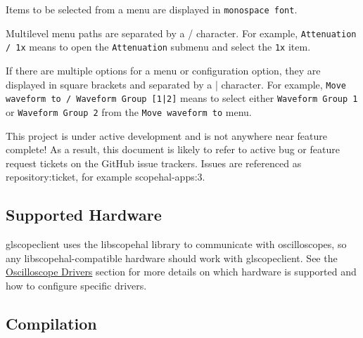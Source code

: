 \documentclass[11pt]{article}
\newcommand{\menustyle}[1]{\texttt{#1}}
\begin{document}
Items to be selected from a menu are displayed in \menustyle{monospace font}.

Multilevel menu paths are separated by a / character. For example, \menustyle{Attenuation / 1x} means to open the
\menustyle{Attenuation} submenu and select the \menustyle{1x} item.

If there are multiple options for a menu or configuration option, they are displayed in square brackets and separated
by a | character. For example, \menustyle{Move waveform to / Waveform Group [1|2]} means to select either
\menustyle{Waveform Group 1} or \menustyle{Waveform Group 2} from the \menustyle{Move waveform to}
menu.

This project is under active development and is not anywhere near feature complete! As a result, this document is
likely to refer to active bug or feature request tickets on the GitHub issue trackers. Issues are referenced as
repository:ticket, for example scopehal-apps:3.

\subsection{Supported Hardware}

glscopeclient uses the libscopehal library to communicate with oscilloscopes, so any libscopehal-compatible hardware
should work with glscopeclient. See the \hyperref[sec:drivers]{Oscilloscope Drivers} section for more details on which
hardware is supported and how to configure specific drivers.

\subsection{Compilation}
\end{document}
